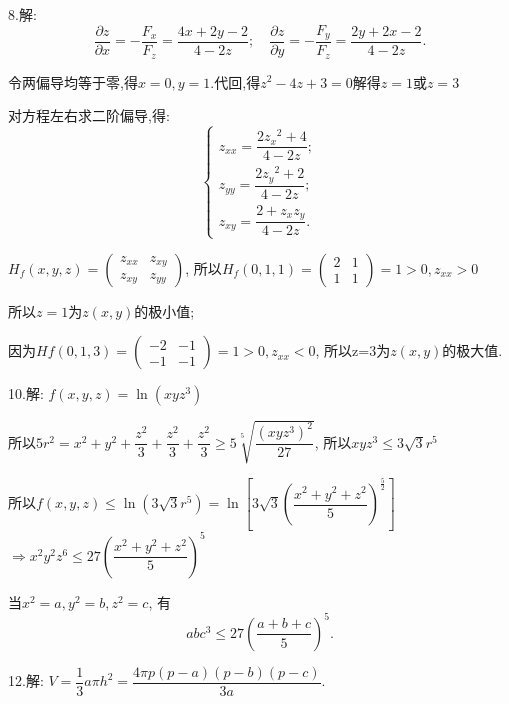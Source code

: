   8.解: \[\dfrac{{\partial z}}{{\partial x}} =  - \dfrac{{{F_x}}}{{{F_z}}} =  \dfrac{{4x + 2y - 2}}{{4 - 2z}}; \quad
  \dfrac{{\partial z}}{{\partial y}} =  - \dfrac{{{F_y}}}{{{F_z}}} = \dfrac{{2y + 2x - 2}}{{4 - 2z}}.\]

  令两偏导均等于零,得$x  = 0,y = 1. $代回,得${z^2} - 4z + 3 = 0$解得$ z = 1 $或$ z=3$

  对方程左右求二阶偏导,得:
  \[\begin{cases}
  {z_{xx}} = \dfrac{{2{z_x}^2 + 4}}{{4 - 2z}};\\
  {z_{yy}} = \dfrac{{2{z_y}^2 + 2}}{{4 - 2z}};\\
  {z_{xy}} = \dfrac{{2 + z{}_x{z_y}}}{{4 - 2z}}.
  \end{cases}\]

  $ H_f\left( {x,y,z} \right) = \left( {\begin{array}{*{20}{c}}
    {{z_{xx}}}&{{z_{xy}}}\\
    {{z_{xy}}}&{{z_{yy}}}
    \end{array}} \right)$,
  所以$ H_f\left( {0,1,1} \right) = \left( {\begin{array}{*{20}{c}}
    2&1\\
    1&1
    \end{array}} \right) = 1 > 0,{z_{xx}} > 0 $

  所以$z=1$为$ z\left( {x,y} \right) $的极小值;

  因为$  Hf\left( {0,1,3} \right) = \left( {\begin{array}{*{20}{c}}
    { - 2}&{ - 1}\\
    { - 1}&{ - 1}
    \end{array}} \right) = 1 > 0,{z_{xx}} < 0 $,
  所以z=3为$z\left( {x,y} \right) $的极大值.

  10.解: $f\left( {x,y,z} \right) = \ln \left( {xy{z^3}} \right)$

  所以$ 5{r^2} = {x^2} + {y^2} + \dfrac{{{z^2}}}{3} + \dfrac{{{z^2}}}{3} + \dfrac{{{z^2}}}{3} \ge 5\sqrt[5]{{\dfrac{{{{(xy{z^3})}^2}}}{{27}}}}$,
  所以$xy{z^3} \le 3\sqrt 3 {r^5}$

  所以$ f\left( {x,y,z} \right) \le \ln \left( {3\sqrt 3 {r^5}} \right) = \ln \left[ {3\sqrt 3 {{\left( {\dfrac{{{x^2} + {y^2} + {z^2}}}{5}} \right)}^{\frac{5}{2}}}} \right]$
  $ \Rightarrow {x^2}{y^2}{z^6} \le 27{\left( {\dfrac{{{x^2} + {y^2} + {z^2}}}{5}} \right)^5}$

  当$ {x^2} = a,{y^2} = b,{z^2} = c$,
  有\[ab{c^3} \le 27{\left( {\dfrac{{a + b + c}}{5}} \right)^5}.\]

  12.解: $ V = \dfrac{1}{3}a\pi {h^2} = \dfrac{{4\pi p\left( {p - a} \right)\left( {p - b} \right)\left( {p - c} \right)}}{{3a}}. $


